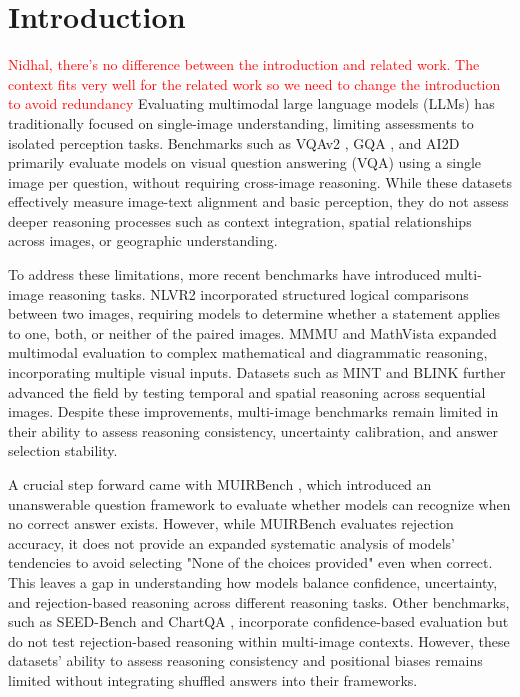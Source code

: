 \section{Introduction}
\textcolor{red}{Nidhal, there's no difference between the introduction and related work. The context fits very well for the related work so we need to change the introduction to avoid redundancy}
Evaluating multimodal large language models (LLMs) has traditionally focused on single-image understanding, limiting assessments to isolated perception tasks. Benchmarks such as VQAv2 \cite{goyal2017making}, GQA \cite{hudson2019gqa}, and AI2D \cite{kembhavi2016diagram} primarily evaluate models on visual question answering (VQA) using a single image per question, without requiring cross-image reasoning. While these datasets effectively measure image-text alignment and basic perception, they do not assess deeper reasoning processes such as context integration, spatial relationships across images, or geographic understanding.

To address these limitations, more recent benchmarks have introduced multi-image reasoning tasks. NLVR2 \cite{suhr2019nlvr2} incorporated structured logical comparisons between two images, requiring models to determine whether a statement applies to one, both, or neither of the paired images. MMMU \cite{yue2024mmmu} and MathVista \cite{mathvista} expanded multimodal evaluation to complex mathematical and diagrammatic reasoning, incorporating multiple visual inputs. Datasets such as MINT \cite{wang2023mint} and BLINK \cite{fu2024blink} further advanced the field by testing temporal and spatial reasoning across sequential images. Despite these improvements, multi-image benchmarks remain limited in their ability to assess reasoning consistency, uncertainty calibration, and answer selection stability.

A crucial step forward came with MUIRBench \cite{wang2024muirbench}, which introduced an unanswerable question framework to evaluate whether models can recognize when no correct answer exists. However, while MUIRBench \cite{wang2024muirbench} evaluates rejection accuracy, it does not provide an expanded systematic analysis of models’ tendencies to avoid selecting "None of the choices provided" even when correct. This leaves a gap in understanding how models balance confidence, uncertainty, and rejection-based reasoning across different reasoning tasks. Other benchmarks, such as SEED-Bench \cite{li2023seedbench} and ChartQA \cite{masry2022chartqa}, incorporate confidence-based evaluation but do not test rejection-based reasoning within multi-image contexts. However, these datasets' ability to assess reasoning consistency and positional biases remains limited without integrating shuffled answers into their frameworks. 

